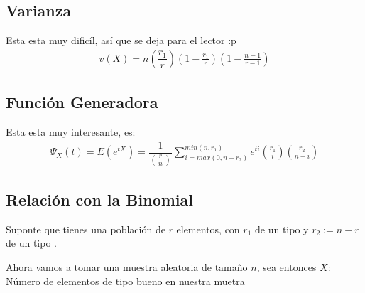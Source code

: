 \documentclass[12pt, fleqn]{report}                             %
\newcommand \Quote {\qq}                                        %
\theoremstyle{break}                                            %
\newcommand{\Wrap}[1]{\left( #1 \right)}                        %
\newcommand{\pfrac}[2]{\Wrap{\dfrac{#1}{#2}}}                   %
\begin{document}
            \subsection{Varianza}

                Esta esta muy dificíl, así que se deja para el lector :p
                \begin{align*}
                    v(X) = n \pfrac{r_1}{r} \Wrap{1 - \frac{r_1}{r}} \Wrap{1 - \frac{n - 1}{r - 1}}
                \end{align*}
                    

                

            \clearpage
            \subsection{Función Generadora}

                Esta esta muy interesante, es:
                \begin{align*}
                    \Psi_X(t) 
                        = E( e^{tX} )                 
                        = \dfrac{1}{\binom{r}{n}}                      
                            \sum_{i = max (0, n - r_2)}^{min(n, r_1)}               
                               e^{ti} \binom{r_1}{i} \binom{r_2}{n - i}
                \end{align*}


            \clearpage
            \subsection{Relación con la Binomial}

                Suponte que tienes una población de $r$ elementos, con $r_1$ de un tipo \Quote{bueno}
                y $r_2 := n - r$ de un tipo \Quote{malo}.

                Ahora vamos a tomar una muestra aleatoria de tamaño $n$,
                sea entonces $X : $ Número de elementos de tipo bueno en nuestra muetra 
\end{document}
